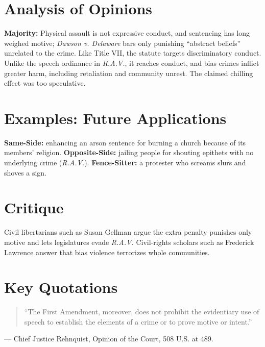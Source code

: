 \documentclass[12pt]{article}
\begin{document}
\section{Analysis of Opinions}
\textbf{Majority:} Physical assault is not expressive conduct, and sentencing has long weighed motive; \textit{Dawson v. Delaware} bars only punishing ``abstract beliefs'' unrelated to the crime. Like Title VII, the statute targets discriminatory conduct. Unlike the speech ordinance in \textit{R.A.V.}, it reaches conduct, and bias crimes inflict greater harm, including retaliation and community unrest. The claimed chilling effect was too speculative.

\section{Examples: Future Applications}
\textbf{Same-Side:} enhancing an arson sentence for burning a church because of its members' religion. \textbf{Opposite-Side:} jailing people for shouting epithets with no underlying crime (\textit{R.A.V.}). \textbf{Fence-Sitter:} a protester who screams slurs and shoves a sign.

\section{Critique}
Civil libertarians such as Susan Gellman argue the extra penalty punishes only motive and lets legislatures evade \textit{R.A.V.} Civil-rights scholars such as Frederick Lawrence answer that bias violence terrorizes whole communities.

\section{Key Quotations}
\begin{quote}
``The First Amendment, moreover, does not prohibit the evidentiary use of speech to establish the elements of a crime or to prove motive or intent.''
\end{quote}
\noindent --- Chief Justice Rehnquist, Opinion of the Court, 508 U.S. at 489.
\end{document}
